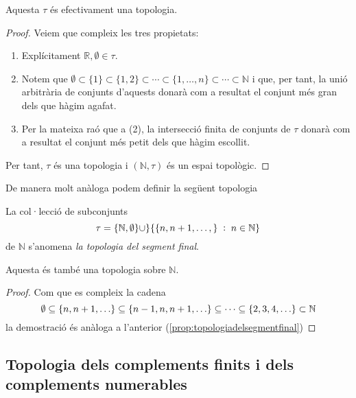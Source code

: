 \documentclass[../main.tex]{subfiles}
\begin{document}
\begin{prop}
\label{prop:topologiadelsegmentinicial} Aquesta $\tau$ és efectivament una topologia.
\end{prop}
\begin{proof}
Veiem que compleix les tres propietats:
\begin{enumerate}[(1)]
    \item Explícitament $\mathbb{R},\emptyset\in\tau$.
    \item Notem que $\emptyset\subset\{1\}\subset\{1,2\}\subset\cdots\subset\{1,\ldots,n\}\subset\cdots\subset\mathbb{N}$ i que, per tant, la unió arbitrària de conjunts d'aquests donarà com a resultat el conjunt més gran dels que hàgim agafat.
    \item Per la mateixa raó que a (2), la intersecció finita de conjunts de $\tau$ donarà com a resultat el conjunt més petit dels que hàgim escollit.
\end{enumerate}
Per tant, $\tau$ és una topologia i $(\mathbb{N},\tau)$ és un espai topològic.
\end{proof}

De manera molt anàloga podem definir la següent topologia
\begin{defi}
\label{def:topologiadelsegmentfinal} La col·lecció de subconjunts
\begin{equation}
    \notag
    \tau = \{\mathbb{N},\emptyset\}\cup\}\{\{n,n+1,\ldots,\}\;:\;n\in\mathbb{N}\}
\end{equation}
de $\mathbb{N}$ s'anomena \textit{la topologia del segment final}.
\end{defi}

\begin{prop}
\label{prop:topologiadelsegmentfinal} Aquesta és també una topologia sobre $\mathbb{N}$.
\end{prop}
\begin{proof}
Com que es compleix la cadena
\begin{equation}
    \notag
    \emptyset\subseteq \{n,n+1,\ldots\}\subseteq \{n-1,n,n+1,\ldots\}\subseteq \cdots\subseteq \{2,3,4,\ldots\}\subset\mathbb{N}
\end{equation}
la demostració és anàloga a l'anterior (\ref{prop:topologiadelsegmentfinal})
\end{proof}

\subsection{Topologia dels complements finits i dels complements numerables}
\end{document}
